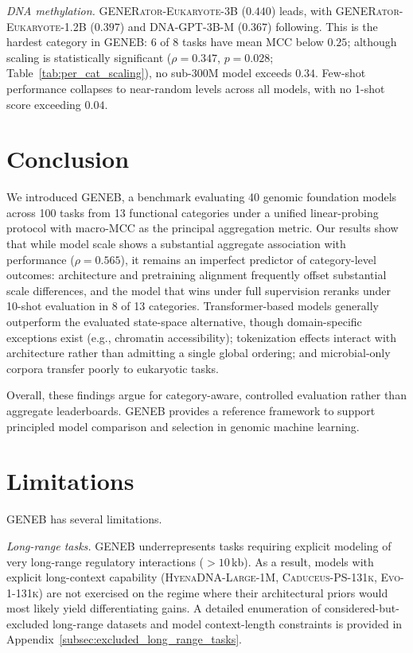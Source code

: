 \documentclass{llmxive}
\begin{document}
\textit{DNA methylation.} \textsc{GENERator-Eukaryote-3B} ($0.440$)
leads, with \textsc{GENERator-Eukaryote-1.2B} ($0.397$) and
\textsc{DNA-GPT-3B-M} ($0.367$) following. This is the hardest
category in GENEB: $6$ of $8$ tasks have mean MCC below $0.25$;
although scaling is statistically significant
($\rho = 0.347$, $p = 0.028$; Table~\ref{tab:per_cat_scaling}),
no sub-300M model exceeds $0.34$. Few-shot performance collapses
to near-random levels across all models, with no 1-shot score
exceeding $0.04$.

\section{Conclusion}

We introduced GENEB, a benchmark evaluating 40 genomic foundation
models across 100 tasks from 13 functional categories under a
unified linear-probing protocol with macro-MCC as the principal
aggregation metric. Our results show that while model scale shows a substantial
aggregate association with performance ($\rho = 0.565$), it remains
an imperfect predictor of category-level outcomes: architecture and
pretraining alignment frequently offset substantial scale
differences, and the model that wins under full supervision reranks
under 10-shot evaluation in 8 of 13 categories. Transformer-based models generally outperform
the evaluated state-space alternative, though domain-specific
exceptions exist (e.g., chromatin accessibility); tokenization
effects interact with architecture rather than admitting a single
global ordering; and microbial-only corpora transfer poorly to
eukaryotic tasks.

Overall, these findings argue for category-aware, controlled
evaluation rather than aggregate leaderboards. GENEB provides a
reference framework to support principled model comparison and
selection in genomic machine learning.

\section{Limitations}

GENEB has several limitations.

\textit{Long-range tasks.} GENEB underrepresents tasks requiring
explicit modeling of very long-range regulatory interactions
($>10$\,kb). As a result, models with explicit long-context capability
(\textsc{HyenaDNA-Large-1M}, \textsc{Caduceus-PS-131k},
\textsc{Evo-1-131k}) are not exercised on the regime where their
architectural priors would most likely yield differentiating gains.
A detailed enumeration of considered-but-excluded long-range datasets
and model context-length constraints is provided in
Appendix~\ref{subsec:excluded_long_range_tasks}.
\end{document}
